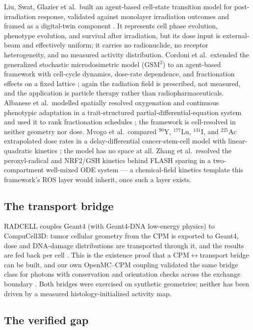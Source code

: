 \documentclass[11pt]{article}
\begin{document}
Liu, Swat, Glazier et al.\ built an agent-based cell-state transition model for
post-irradiation response, validated against monolayer irradiation outcomes and framed as
a digital-twin component \cite{liu2025pbt}. It represents cell phase evolution, phenotype
evolution, and survival after irradiation, but its dose input is external-beam and
effectively uniform; it carries no radionuclide, no receptor heterogeneity, and no measured
activity distribution. Cordoni et al.\ extended the generalized stochastic microdosimetric
model (GSM$^2$) to an agent-based framework with cell-cycle dynamics, dose-rate dependence,
and fractionation effects on a fixed lattice \cite{cordoni2026}; again the radiation field
is prescribed, not measured, and the application is particle therapy rather than
radiopharmaceuticals. Albanese et al.\ modelled spatially resolved oxygenation and
continuous phenotypic adaptation in a trait-structured partial-differential-equation system
and used it to rank fractionation schedules \cite{albanese2026}; the framework is
cell-resolved in neither geometry nor dose. Mvogo et al.\ compared $^{90}$Y, $^{177}$Lu,
$^{131}$I, and $^{225}$Ac extrapolated dose rates in a delay-differential cancer-stem-cell
model with linear-quadratic kinetics \cite{mvogo2026}; the model has no space at all. Zhang
et al.\ resolved the peroxyl-radical and NRF2/GSH kinetics behind FLASH sparing in a
two-compartment well-mixed ODE system \cite{zhang2025flash} --- a chemical-field kinetics
template this framework's ROS layer would inherit, once such a layer exists.

\subsection{The transport bridge}

RADCELL couples Geant4 (with Geant4-DNA low-energy physics) to CompuCell3D: tumor cellular
geometry from the CPM is exported to Geant4, dose and DNA-damage distributions are
transported through it, and the results are fed back per cell \cite{liu2021radcell}. This
is the existence proof that a CPM$\leftrightarrow$transport bridge can be built, and our
own OpenMC--CPM coupling validated the same bridge class for photons with conservation and
orientation checks across the exchange boundary \cite{kinder2026biofilm}. Both bridges
were exercised on synthetic geometries; neither has been driven by a measured
histology-initialized activity map.

\subsection{The verified gap}
\end{document}
